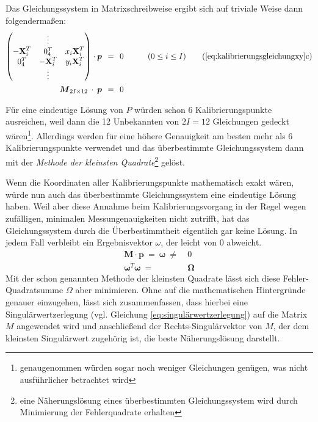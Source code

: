 Das Gleichungssystem in Matrixschreibweise ergibt sich auf triviale Weise dann folgendermaßen:
\begin{align*}
	\begin{pmatrix}
		&\vdots&\\
		-\XH_i^T & 0_4^T & x_i\XH_i^T\\
		0_4^T & -\XH_i^T & y_i\XH_i^T\\
		&\vdots&\\
	\end{pmatrix}
	\cdot \boldsymbol{p} {\:\:}&={\:\:} 0
	\qquad\quad (0 \leq i \leq I) \tag{\ref{eq:kalibrierungsgleichungxy}c}\\
	\boldsymbol{M}_{2I{\times}12} \:\cdot\: \boldsymbol{p} {\:\:}&={\:\:} 0
\end{align*}

Für eine eindeutige Lösung von $P$ würden schon 6 Kalibrierungspunkte ausreichen, weil dann die 12 Unbekannten von $2I=12$ Gleichungen gedeckt wären\footnote{genaugenommen würden sogar noch weniger Gleichungen genügen, was nicht ausführlicher betrachtet wird}. Allerdings werden für eine höhere Genauigkeit am besten mehr als 6 Kalibrierungspunkte verwendet und das überbestimmte Gleichungssystem dann mit der \emph{Methode der kleinsten Quadrate}\footnote{eine Näherungslösung eines überbestimmten Gleichungssystem wird durch Minimierung der Fehlerquadrate erhalten} gelöst.\kleinerabstand

{\noindent}Wenn die Koordinaten aller Kalibrierungspunkte mathematisch exakt wären, würde nun auch das überbestimmte Gleichungssystem eine eindeutige Lösung haben. Weil aber diese Annahme beim Kalibrierungsvorgang in der Regel wegen zufälligen, minimalen Messungenauigkeiten nicht zutrifft, hat das Gleichungssystem durch die Überbestimmtheit eigentlich gar keine Lösung. In jedem Fall verbleibt ein Ergebnisvektor $\omega$, der leicht von $0$ abweicht.
\begin{align}
	\boldsymbol{M}\cdot\boldsymbol{p} {\:}={\:} \boldsymbol{\omega} {\:}\not=&{\:} 0\\
	\boldsymbol{\omega}^T  \boldsymbol{\omega} {\:}=&{\:} \boldsymbol{\Omega}
\end{align}
Mit der schon genannten Methode der kleinsten Quadrate lässt sich diese Fehler-Quadratsumme $\Omega$ aber minimieren. Ohne auf die mathematischen Hintergründe genauer einzugehen, lässt sich zusammenfassen, dass hierbei eine Singulärwertzerlegung (vgl. Gleichung \ref{eq:singulärwertzerlegung}) auf die Matrix $M$ angewendet wird und anschließend der Rechts-Singulärvektor von $M$, der dem kleinsten Singulärwert zugehörig ist, die beste Näherungslösung darstellt.\kleinerabstand


